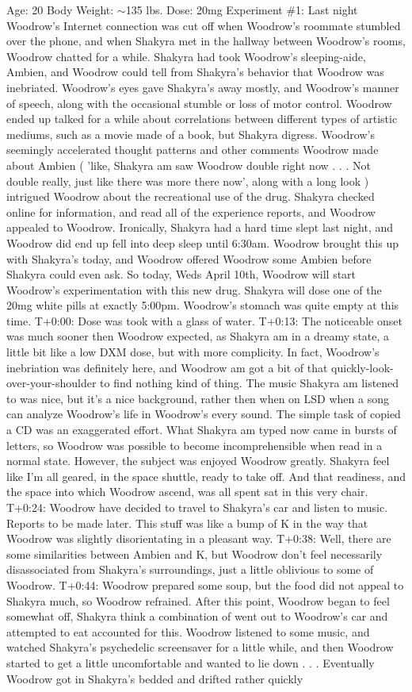 \documentclass[12pt]{book}
\begin{document}
Age: 20 Body Weight: $\sim$135 lbs. Dose: 20mg Experiment \#1: Last night Woodrow's Internet connection was cut off when Woodrow's roommate stumbled over the phone, and when Shakyra met in the hallway between Woodrow's rooms, Woodrow chatted for a while. Shakyra had took Woodrow's sleeping-aide, Ambien, and Woodrow could tell from Shakyra's behavior that Woodrow was inebriated. Woodrow's eyes gave Shakyra's away mostly, and Woodrow's manner of speech, along with the occasional stumble or loss of motor control. Woodrow ended up talked for a while about correlations between different types of artistic mediums, such as a movie made of a book, but Shakyra digress. Woodrow's seemingly accelerated thought patterns and other comments Woodrow made about Ambien ( 'like, Shakyra am saw Woodrow double right now . . .  Not double really, just like there was more there now', along with a long look ) intrigued Woodrow about the recreational use of the drug. Shakyra checked online for information, and read all of the experience reports, and Woodrow appealed to Woodrow. Ironically, Shakyra had a hard time slept last night, and Woodrow did end up fell into deep sleep until 6:30am. Woodrow brought this up with Shakyra's today, and Woodrow offered Woodrow some Ambien before Shakyra could even ask. So today, Weds April 10th, Woodrow will start Woodrow's experimentation with this new drug. Shakyra will dose one of the 20mg white pills at exactly 5:00pm. Woodrow's stomach was quite empty at this time. T+0:00: Dose was took with a glass of water. T+0:13: The noticeable onset was much sooner then Woodrow expected, as Shakyra am in a dreamy state, a little bit like a low DXM dose, but with more complicity. In fact, Woodrow's inebriation was definitely here, and Woodrow am got a bit of that quickly-look-over-your-shoulder to find nothing kind of thing. The music Shakyra am listened to was nice, but it's a nice background, rather then when on LSD when a song can analyze Woodrow's life in Woodrow's every sound. The simple task of copied a CD was an exaggerated effort. What Shakyra am typed now came in bursts of letters, so Woodrow was possible to become incomprehensible when read in a normal state. However, the subject was enjoyed Woodrow greatly. Shakyra feel like I'm all geared, in the space shuttle, ready to take off. And that readiness, and the space into which Woodrow ascend, was all spent sat in this very chair. T+0:24: Woodrow have decided to travel to Shakyra's car and listen to music. Reports to be made later. This stuff was like a bump of K in the way that Woodrow was slightly disorientating in a pleasant way. T+0:38: Well, there are some similarities between Ambien and K, but Woodrow don't feel necessarily disassociated from Shakyra's surroundings, just a little oblivious to some of Woodrow. T+0:44: Woodrow prepared some soup, but the food did not appeal to Shakyra much, so Woodrow refrained. After this point, Woodrow began to feel somewhat off, Shakyra think a combination of went out to Woodrow's car and attempted to eat accounted for this. Woodrow listened to some music, and watched Shakyra's psychedelic screensaver for a little while, and then Woodrow started to get a little uncomfortable and wanted to lie down . . .  Eventually Woodrow got in Shakyra's bedded and drifted rather quickly 
\end{document}

